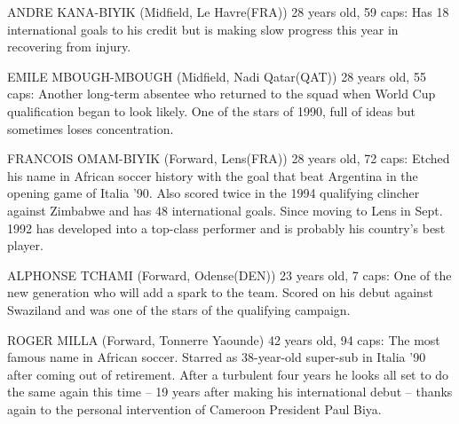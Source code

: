 ANDRE KANA-BIYIK (Midfield, Le Havre(FRA)) 28 years old, 59 caps:
Has 18 international goals to his credit but is making slow progress this year
in recovering from injury.

EMILE MBOUGH-MBOUGH (Midfield, Nadi Qatar(QAT)) 28 years old, 55 caps:
Another long-term absentee who returned to the squad when World Cup 
qualification began to look likely. One of the stars of 1990, full of ideas but
sometimes loses concentration.

FRANCOIS OMAM-BIYIK (Forward, Lens(FRA)) 28 years old, 72 caps:
Etched his name in African soccer history with the goal that beat Argentina in 
the opening game of Italia '90. Also scored twice in the 1994 qualifying 
clincher against Zimbabwe and has 48 international goals. Since moving to Lens
in Sept. 1992 has developed into a top-class performer and is probably his 
country's best player.

ALPHONSE TCHAMI (Forward, Odense(DEN)) 23 years old, 7 caps:
One of the new generation who will add a spark to the team. Scored on his debut 
against Swaziland and was one of the stars of the qualifying campaign.

ROGER MILLA (Forward, Tonnerre Yaounde) 42 years old, 94 caps:
The most famous name in African soccer. Starred as 38-year-old super-sub in 
Italia '90 after coming out of retirement. After a turbulent four years he 
looks all set to do the same again this time -- 19 years after making his 
international debut -- thanks again to the personal intervention of Cameroon 
President Paul Biya.

